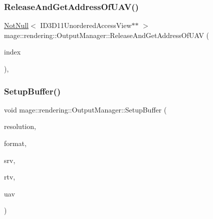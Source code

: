 \subsubsection{\texorpdfstring{Release\+And\+Get\+Address\+Of\+U\+A\+V()}{ReleaseAndGetAddressOfUAV()}}
{\footnotesize\ttfamily \hyperlink{namespacemage_a8769f9d670d6b585ea306cb1062af94b}{Not\+Null}$<$ I\+D3\+D11\+Unordered\+Access\+View$\ast$$\ast$ $>$ mage\+::rendering\+::\+Output\+Manager\+::\+Release\+And\+Get\+Address\+Of\+U\+AV (\begin{DoxyParamCaption}\item[{\hyperlink{classmage_1_1rendering_1_1_output_manager_a71b3797fef957312f92736f15b7ada3e}{U\+A\+V\+Index}}]{index }\end{DoxyParamCaption})\hspace{0.3cm}{\ttfamily [private]}, {\ttfamily [noexcept]}}

\hypertarget{classmage_1_1rendering_1_1_output_manager_aca32d0307be3acfaa8f5a20fa24b6934}{}\label{classmage_1_1rendering_1_1_output_manager_aca32d0307be3acfaa8f5a20fa24b6934} 
\subsubsection{\texorpdfstring{Setup\+Buffer()}{SetupBuffer()}}
{\footnotesize\ttfamily void mage\+::rendering\+::\+Output\+Manager\+::\+Setup\+Buffer (\begin{DoxyParamCaption}\item[{const \hyperlink{namespacemage_ab3633c193f686845fcf80ce95d18a20b}{U32x3} \&}]{resolution,  }\item[{D\+X\+G\+I\+\_\+\+F\+O\+R\+M\+AT}]{format,  }\item[{I\+D3\+D11\+Shader\+Resource\+View $\ast$$\ast$}]{srv,  }\item[{I\+D3\+D11\+Render\+Target\+View $\ast$$\ast$}]{rtv,  }\item[{I\+D3\+D11\+Unordered\+Access\+View $\ast$$\ast$}]{uav }\end{DoxyParamCaption})\hspace{0.3cm}{\ttfamily [private]}}

\hypertarget{classmage_1_1rendering_1_1_output_manager_a590172441d291329d1f5a9dbbdb71320}{}\label{classmage_1_1rendering_1_1_output_manager_a590172441d291329d1f5a9dbbdb71320} 
